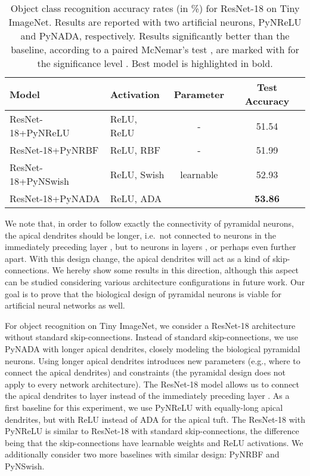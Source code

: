 \documentclass[pdflatex,sn-mathphys]{sn-jnl}
\theoremstyle{thmstyleone}
\theoremstyle{thmstyletwo}\newtheorem{example}{Example}\newtheorem{remark}{Remark}
\theoremstyle{thmstylethree}\newtheorem{definition}{Definition}\DeclareMathOperator{\sinc}{sinc}
\begin{document}
\begin{table*}[!t]
\caption{Object class recognition accuracy rates (in \%) for ResNet-18 on Tiny ImageNet. Results are reported with two artificial neurons, PyNReLU and PyNADA, respectively. Results significantly better than the baseline, according to a paired McNemar's test \citep{Dietterich-NC-1998}, are marked with  for the significance level . Best model is highlighted in bold.}
\label{tab_Tiny}
\small{
\begin{center} 
\begin{tabular}{llcc}
\toprule
{\bf Model}                           & {\bf Activation}        & {\bf Parameter}             & {\bf Test Accuracy}\\
\midrule
ResNet-18+PyNReLU                   & ReLU, ReLU 	 & - 	                & 51.54\\
ResNet-18+PyNRBF                    & ReLU, RBF 	    & -	                    & 51.99\\
ResNet-18+PyNSwish                  & ReLU, Swish 	    & learnable     & 52.93\\
ResNet-18+PyNADA                    & ReLU, ADA 	 & 	        & {\bf 53.86}\\ 
\bottomrule
\end{tabular}
\end{center}
}
\end{table*}

We note that, in order to follow exactly the connectivity of pyramidal neurons, the apical dendrites should be longer, i.e.~not connected to neurons in the immediately preceding layer , but to neurons in layers ,  or perhaps even further apart. With this design change, the apical dendrites will act as a kind of skip-connections. We hereby show some results in this direction, although this aspect can be studied considering various architecture configurations in future work. Our goal is to prove that the biological design of pyramidal neurons is viable for artificial neural networks as well.

For object recognition on Tiny ImageNet, we consider a ResNet-18 architecture \citep{He-CVPR-2016} without standard skip-connections. Instead of standard skip-connections, we use PyNADA with longer apical dendrites, closely modeling the biological pyramidal neurons. Using longer apical dendrites introduces new parameters (e.g., where to connect the apical dendrites) and constraints (the pyramidal design does not apply to every network architecture). The ResNet-18 model allows us to connect the apical dendrites to layer  instead of the immediately preceding layer . As a first baseline for this experiment, we use PyNReLU with equally-long apical dendrites, but with ReLU instead of ADA for the apical tuft. The ResNet-18 with PyNReLU is similar to ResNet-18 with standard skip-connections, the difference being that the skip-connections have learnable weights and ReLU activations. We additionally consider two more baselines with similar design: PyNRBF and PyNSwish.
\end{document}
